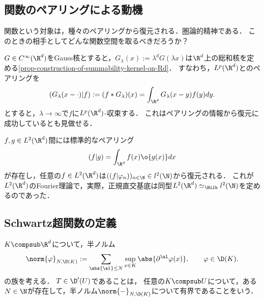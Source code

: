 \documentclass[uplatex,dvipdfmx]{jsreport}
\begin{document}
\subsection{関数のペアリングによる動機}

\begin{tcolorbox}[colframe=ForestGreen, colback=ForestGreen!10!white,breakable,colbacktitle=ForestGreen!40!white,coltitle=black,fonttitle=\bfseries\sffamily,
title=]
    関数という対象は，種々のペアリングから復元される．圏論的精神である．
    このときの相手としてどんな関数空間を取るべきだろうか？
\end{tcolorbox}

\begin{example}[Gauss核との畳み込みを通じたペアリング]
    $G\in C^\infty(\R^d)$をGauss核とすると，$G_\lambda(x):=\lambda^dG(\lambda x)$は$\R^d$上の総和核を定める\ref{prop-construction-of-summability-kernel-on-Rd}．
    すなわち，$L^p(\R^d)$とのペアリングを
    \[(G_\lambda(x-\cdot)|f):=(f*G_\lambda)(x)=\int_{\R^d}G_\lambda(x-y)f(y)dy.\]
    とすると，$\lambda\to\infty$で$f$に$L^p(\R^d)$-収束する．
    これはペアリングの情報から復元に成功しているとも見做せる．
\end{example}

\begin{example}[正規直交基底が定めるペアリング]
    $f,g\in L^2(\R^d)$間には標準的なペアリング
    \[(f|g)=\int_{\R^d}f(x)\o{g(x)}dx\]
    が存在し，任意の$f\in L^2(\R^d)$は$((f|\varphi_n))_{n\in\N}\in l^2(\N)$から復元される．
    これが$L^2(\R^d)$のFourier理論で，実際，正規直交基底は同型$L^2(\R^d)\simeq_\Hilb l^2(\N)$を定めるのであった．
\end{example}

\subsection{Schwartz超関数の定義}

\begin{tcolorbox}[colframe=ForestGreen, colback=ForestGreen!10!white,breakable,colbacktitle=ForestGreen!40!white,coltitle=black,fonttitle=\bfseries\sffamily,
title=]
    $K\compsub\R^d$について，半ノルム
    \[\norm{\varphi}_{N,\D(K)}:=\sum_{\abs{\al}\le N}\sup_{x\in K}\abs{\partial^\al\varphi(x)},\qquad\varphi\in\D(K).\]
    の族を考える．
    $T\in\D'(U)$であることは，
    任意の$K\compsub U$について，ある$N\in\N$が存在して，半ノルム$\norm{-}_{N,\D(K)}$について有界であることをいう．
\end{tcolorbox}
\end{document}
